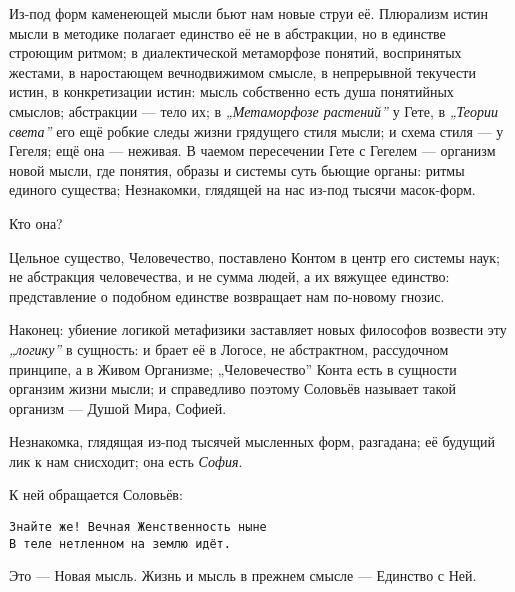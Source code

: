 \documentclass[12pt,a4paper,oneside]{book}
\begin{document}
Из-под форм каменеющей мысли бьют нам новые струи её. Плюрализм истин мысли в методике полагает единство её не в абстракции, но в единстве строющим ритмом; в диалектической метаморфозе понятий, воспринятых жестами, в наростающем вечнодвижимом смысле, в непрерывной текучести истин, в конкретизации истин: мысль собственно есть душа понятийных смыслов; абстракции — тело их; в \emph{„Метаморфозе растений”} у Гете, в \emph{„Теории света”} его ещё робкие следы жизни грядущего стиля мысли; и схема стиля — у Гегеля; ещё она — неживая. В чаемом пересечении Гете с Гегелем — организм новой мысли, где понятия, образы и системы суть бьющие органы: ритмы единого существа; Незнакомки, глядящей на нас из-под тысячи масок-форм.

Кто она?

Цельное существо, Человечество, поставлено Контом в центр его системы наук; не абстракция человечества, и не сумма людей, а их вяжущее единство: представление о подобном единстве возвращает нам по-новому гнозис.

Наконец: убиение логикой метафизики заставляет новых философов возвести эту \emph{„логику”} в сущность: и брает её в Логосе, не абстрактном, рассудочном принципе, а в Живом Организме; „Человечество” Конта есть в сущности органзим жизни мысли; и справедливо поэтому Соловьёв называет такой организм — Душой Мира, Софией.

Незнакомка, глядящая из-под тысячей мысленных форм, разгадана; её будущий лик к нам снисходит; она есть \emph{София}.

К ней обращается Соловьёв:

\begin{Verbatim}
Знайте же! Вечная Женственность ныне
В теле нетленном на землю идёт. 
\end{Verbatim}

Это — Новая мысль. Жизнь и мысль в прежнем смысле — Единство с Ней.
\end{document}
